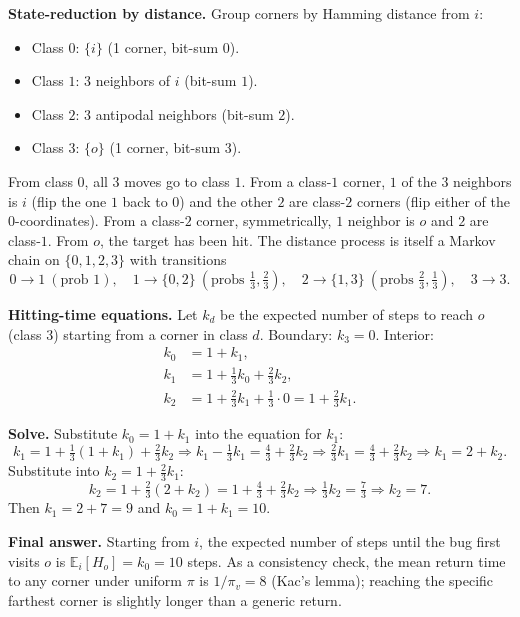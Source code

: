 \documentclass[12pt]{article}
\newcommand{\EE}{\mathbb{E}}
\begin{document}
\textbf{State-reduction by distance.} Group corners by Hamming distance from $i$:
\begin{itemize}[leftmargin=1.5em,itemsep=1pt]
  \item Class $0$: $\{i\}$ (1 corner, bit-sum $0$).
  \item Class $1$: $3$ neighbors of $i$ (bit-sum $1$).
  \item Class $2$: $3$ antipodal neighbors (bit-sum $2$).
  \item Class $3$: $\{o\}$ (1 corner, bit-sum $3$).
\end{itemize}
From class $0$, all $3$ moves go to class $1$. From a class-$1$ corner, $1$ of the $3$ neighbors is $i$ (flip the one $1$ back to $0$) and the other $2$ are class-$2$ corners (flip either of the $0$-coordinates). From a class-$2$ corner, symmetrically, $1$ neighbor is $o$ and $2$ are class-$1$. From $o$, the target has been hit. The distance process is itself a Markov chain on $\{0,1,2,3\}$ with transitions
\[
  0\to 1\ (\text{prob }1),\quad 1\to\{0,2\}\ (\text{probs }\tfrac13,\tfrac23),\quad 2\to\{1,3\}\ (\text{probs }\tfrac23,\tfrac13),\quad 3\to 3.
\]

\textbf{Hitting-time equations.} Let $k_d$ be the expected number of steps to reach $o$ (class $3$) starting from a corner in class $d$. Boundary: $k_3=0$. Interior:
\begin{align*}
  k_0 &= 1 + k_1,\\
  k_1 &= 1 + \tfrac13 k_0 + \tfrac23 k_2,\\
  k_2 &= 1 + \tfrac23 k_1 + \tfrac13\cdot 0 = 1+\tfrac23 k_1.
\end{align*}

\textbf{Solve.} Substitute $k_0=1+k_1$ into the equation for $k_1$:
\[
  k_1 = 1 + \tfrac13(1+k_1) + \tfrac23 k_2 \Longrightarrow k_1 - \tfrac13 k_1 = \tfrac43 + \tfrac23 k_2
  \Longrightarrow \tfrac23 k_1 = \tfrac43+\tfrac23 k_2 \Longrightarrow k_1 = 2 + k_2.
\]
Substitute into $k_2=1+\tfrac23 k_1$:
\[
  k_2 = 1+\tfrac23(2+k_2) = 1+\tfrac43+\tfrac23 k_2 \Longrightarrow \tfrac13 k_2 = \tfrac73 \Longrightarrow k_2 = 7.
\]
Then $k_1=2+7=9$ and $k_0=1+k_1=10$.

\textbf{Final answer.} Starting from $i$, the expected number of steps until the bug first visits $o$ is $\EE_i[H_o] = k_0 = 10$ steps. As a consistency check, the mean return time to any corner under uniform $\pi$ is $1/\pi_v=8$ (Kac's lemma); reaching the specific farthest corner is slightly longer than a generic return.

\end{document}
